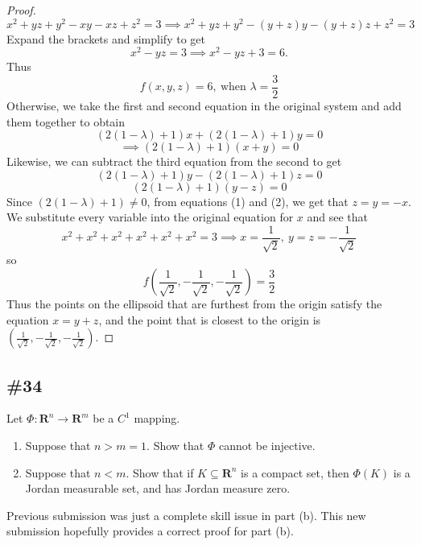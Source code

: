 \documentclass{article}
\newcommand{\R}{\mathbf{R}}
\theoremstyle{plain} %
\numberwithin{thm}{section} %
\theoremstyle{definition}
\begin{document}
\begin{proof}
        \[
            x^2 + yz + y^2 - xy - xz + z^2 = 3 \implies x^2 + yz + y^2 - (y + z)y - (y + z)z + z^2 = 3
        \]
        Expand the brackets and simplify to get
        \[
            x^2 - yz = 3 \implies x^2 - yz + 3 = 6.
        \]
        Thus
        \[
            f(x,y,z) = 6,\ \text{when } \lambda = \frac{3}{2}
        \]
        Otherwise, we take the first and second equation in the original system and add them together to obtain
        \[
            (2(1 - \lambda) + 1)x + (2(1 - \lambda) + 1)y = 0
        \]
        \[
            \implies (2(1 - \lambda) + 1)(x + y) = 0 \tag{1}
        \]
        Likewise, we can subtract the third equation from the second to get
        \[
            (2(1 - \lambda) + 1)y - (2(1 - \lambda) + 1)z = 0
        \]
        \[
            (2(1 - \lambda) + 1)(y - z) = 0 \tag{2}
        \]
        Since \((2(1 - \lambda) + 1) \neq 0\), from equations (1) and (2), we get that \(z = y = -x\). We substitute every variable into the original equation for \(x\) and see that
        \[
            x^2 + x^2 + x^2 + x^2 + x^2 + x^2 = 3 \implies x = \frac{1}{\sqrt{2}},\ y = z = -\frac{1}{\sqrt{2}}
        \]
        so
        \[
            f \left( \frac{1}{\sqrt{2}}, -\frac{1}{\sqrt{2}}, -\frac{1}{\sqrt{2}} \right) = \frac{3}{2}
        \]
        Thus the points on the ellipsoid that are furthest from the origin satisfy the equation \(x = y + z\), and the point that is closest to the origin is \(\left( \frac{1}{\sqrt{2}}, -\frac{1}{\sqrt{2}}, -\frac{1}{\sqrt{2}} \right)\).
        \end{proof}
        \newpage
        \subsection{\#34}
        Let $\Phi:\R^n\rightarrow\R^m$ be a $C^1$ mapping.
        \begin{enumerate}[label=(\alph*)]
            \item Suppose that $n>m = 1$. Show that $\Phi$ cannot be injective.
            
            \item Suppose that $n<m$. Show that if $K\subseteq\R^n$ is a compact set, then $\Phi(K)$ is a Jordan measurable set, and has Jordan measure zero.
        \end{enumerate}
        \color{red}
        Previous submission was just a complete skill issue in part (b). This new submission hopefully provides a correct proof for part (b).
\end{document}
